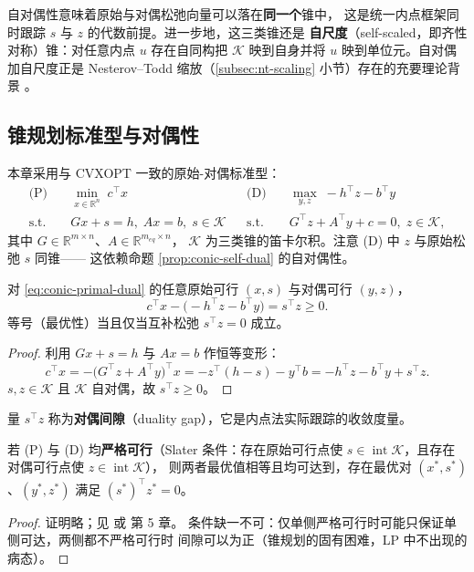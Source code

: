 \begin{remark}
自对偶性意味着原始与对偶松弛向量可以落在\textbf{同一个}锥中，
这是统一内点框架同时跟踪 $s$ 与 $z$ 的代数前提。进一步地，这三类锥还是
\textbf{自尺度}（self-scaled，即齐性对称）锥：对任意内点 $u$ 存在自同构把
$\mathcal{K}$ 映到自身并将 $u$ 映到单位元。自对偶加自尺度正是
Nesterov--Todd 缩放（\ref{subsec:nt-scaling} 小节）存在的充要理论背景
\cite{nesterov1997}。
\end{remark}

\subsection{锥规划标准型与对偶性}

本章采用与 CVXOPT \cite{vandenberghe2010} 一致的原始-对偶标准型：
\begin{equation}
\label{eq:conic-primal-dual}
\begin{aligned}
\text{(P)}\quad & \min_{x \in \mathbb{R}^n}\; c^\top x
  && \text{(D)}\quad & \max_{y, z}\; -h^\top z - b^\top y \\
\text{s.t.}\quad & Gx + s = h,\; Ax = b,\; s \in \mathcal{K}
  && \text{s.t.}\quad & G^\top z + A^\top y + c = 0,\; z \in \mathcal{K},
\end{aligned}
\end{equation}
其中 $G \in \mathbb{R}^{m \times n}$、$A \in \mathbb{R}^{m_{eq} \times n}$，
$\mathcal{K}$ 为三类锥的笛卡尔积。注意 (D) 中 $z$ 与原始松弛 $s$ 同锥——
这依赖命题 \ref{prop:conic-self-dual} 的自对偶性。

\begin{theorem}[弱对偶]
\label{thm:conic-weak-duality}
对 \eqref{eq:conic-primal-dual} 的任意原始可行 $(x, s)$ 与对偶可行 $(y, z)$，
\[
c^\top x - \big(-h^\top z - b^\top y\big) = s^\top z \ge 0.
\]
等号（最优性）当且仅当互补松弛 $s^\top z = 0$ 成立。
\end{theorem}
\begin{proof}
利用 $Gx + s = h$ 与 $Ax = b$ 作恒等变形：
\[
c^\top x = -\big(G^\top z + A^\top y\big)^\top x
 = -z^\top (h - s) - y^\top b = -h^\top z - b^\top y + s^\top z.
\]
$s, z \in \mathcal{K}$ 且 $\mathcal{K}$ 自对偶，故 $s^\top z \ge 0$。
\end{proof}

量 $s^\top z$ 称为\textbf{对偶间隙}（duality gap），它是内点法实际跟踪的收敛度量。

\begin{theorem}
\label{thm:conic-strong-duality}
若 (P) 与 (D) 均\textbf{严格可行}（Slater 条件：存在原始可行点使
$s \in \operatorname{int}\mathcal{K}$，且存在对偶可行点使 $z \in \operatorname{int}\mathcal{K}$），
则两者最优值相等且均可达到，存在最优对 $(x^*, s^*)$、$(y^*, z^*)$ 满足
$(s^*)^\top z^* = 0$。
\end{theorem}
\begin{proof}
证明略；见 \cite{nesterov1994} 或 \cite{boyd2004} 第 5 章。
条件缺一不可：仅单侧严格可行时可能只保证单侧可达，两侧都不严格可行时
间隙可以为正（锥规划的固有困难，LP 中不出现的病态）。
\end{proof}


